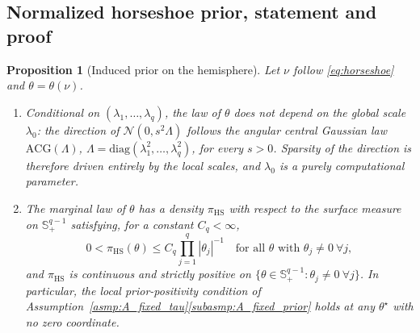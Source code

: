 \documentclass[11pt]{article}
\newtheorem{proposition}{Proposition}
\theoremstyle{definition}
\theoremstyle{plain}
\begin{document}
\subsection{Normalized horseshoe prior, statement and proof}\label{proof:prop:horseshoe_prior}

\begin{proposition}[Induced prior on the hemisphere]\label{prop:horseshoe_prior}
Let $\nu$ follow \eqref{eq:horseshoe} and $\theta=\theta(\nu)$.
\begin{enumerate}[label=(\alph*),nosep]
\item\label{prop:hs_acg} Conditional on $(\lambda_1,\dots,\lambda_q)$, the law of $\theta$ does not depend on the global scale $\lambda_0$: the direction of $\mathcal N(0,s^2\Lambda)$ follows the angular central Gaussian law $\mathrm{ACG}(\Lambda)$, $\Lambda=\mathrm{diag}(\lambda_1^2,\dots,\lambda_q^2)$, for every $s>0$. Sparsity of the direction is therefore driven entirely by the local scales, and $\lambda_0$ is a purely computational parameter.
\item\label{prop:hs_density} The marginal law of $\theta$ has a density $\pi_{\mathrm{HS}}$ with respect to the surface measure on $\mathbb S^{q-1}_+$ satisfying, for a constant $C_q<\infty$,
\[
0<\pi_{\mathrm{HS}}(\theta)\le C_q\prod_{j=1}^q|\theta_j|^{-1}\quad\text{for all }\theta\text{ with }\theta_j\neq0\ \forall j,
\]
and $\pi_{\mathrm{HS}}$ is continuous and strictly positive on $\{\theta\in\mathbb S^{q-1}_+:\theta_j\neq0\ \forall j\}$. In particular, the local prior-positivity condition of Assumption~\ref{asmp:A_fixed_tau}\ref{subasmp:A_fixed_prior} holds at any $\theta^\star$ with no zero coordinate.
\end{enumerate}
\end{proposition}
\end{document}
